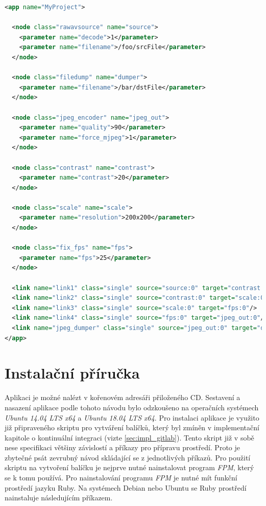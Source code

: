 \documentclass[thesis=M,czech]{FITthesis}[2012/06/26]
\begin{document}
\begin{lstlisting}[language=XML]
<app name="MyProject">

  <node class="rawavsource" name="source">
	<parameter name="decode">1</parameter>
	<parameter name="filename">/foo/srcFile</parameter>
  </node>

  <node class="filedump" name="dumper">
	<parameter name="filename">/bar/dstFile</parameter>
  </node>

  <node class="jpeg_encoder" name="jpeg_out">
    <parameter name="quality">90</parameter>
    <parameter name="force_mjpeg">1</parameter>
  </node>

  <node class="contrast" name="contrast">
	<parameter name="contrast">20</parameter>
  </node>

  <node class="scale" name="scale">
	<parameter name="resolution">200x200</parameter>
  </node>

  <node class="fix_fps" name="fps">
	<parameter name="fps">25</parameter>
  </node>

  <link name="link1" class="single" source="source:0" target="contrast:0"/>
  <link name="link2" class="single" source="contrast:0" target="scale:0"/>
  <link name="link3" class="single" source="scale:0" target="fps:0"/>
  <link name="link4" class="single" source="fps:0" target="jpeg_out:0"/>
  <link name="jpeg_dumper" class="single" source="jpeg_out:0" target="dumper:0"/>
</app>
\end{lstlisting}

\section{Instalační příručka} \label{sec:impl_prirucka}
Aplikaci je možné nalézt v kořenovém adresáři přiloženého CD. Sestavení a nasazení aplikace podle tohoto návodu bylo odzkoušeno na operačních systémech \textit{Ubuntu 14.04 LTS x64} a \textit{Ubuntu 18.04 LTS x64}. Pro instalaci aplikace je využito již připraveného skriptu pro vytváření balíčků, který byl zmíněn v implementační kapitole o kontinuální integraci (vizte \ref{sec:impl_gitlab}). Tento skript již v sobě nese specifikaci většiny závislostí a příkazy pro přípravu prostředí. Proto je zbytečné psát zevrubný návod skládající se z jednotlivých příkazů. Pro použití skriptu na vytvoření balíčku je nejprve nutné nainstalovat program \textit{FPM}, který se k tomu používá. Pro nainstalování programu \textit{FPM} je nutné mít funkční prostředí jazyku Ruby. Na systémech Debian nebo Ubuntu se Ruby prostředí nainstaluje následujícím příkazem.\\
\end{document}
